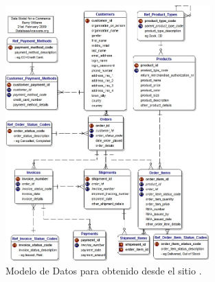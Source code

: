 
\begin{figure}[H]
	\centering
	\includegraphics[width=0.7\textwidth]{figuras/dataModel/examples/database_generic.jpg}
	\caption{Modelo de Datos para \ecommerceCOM obtenido desde el sitio \dataBaseAnswerName \cite{online_official_databaseanswer_global_ecommerce}.}
	\label{figure:apendice:dataModel:examples:database_generic}
\end{figure}